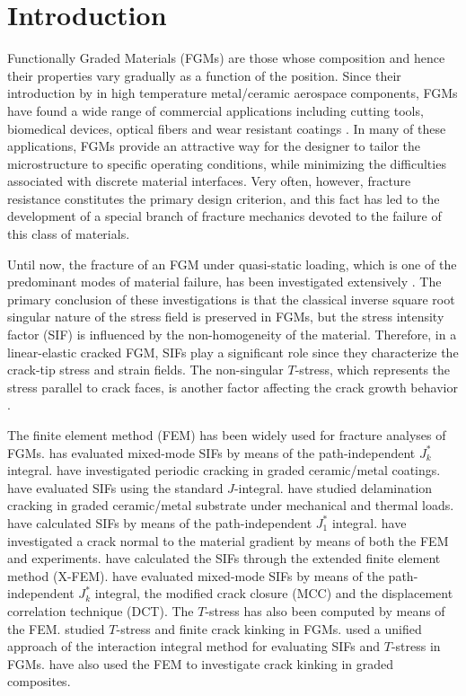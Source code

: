 \section{Introduction}
\label{intro}
Functionally Graded Materials (FGMs) are those whose composition and hence their properties vary gradually as a function of the position. Since their introduction by \cite{Kawasaki1987} in high temperature metal/ceramic aerospace components, FGMs have found a wide range of commercial applications including cutting tools, biomedical devices, optical fibers and wear resistant coatings \citep{Uemura2003}. In many of these applications, FGMs provide an attractive way for the designer to tailor the microstructure to specific operating conditions, while minimizing the difficulties associated with discrete material interfaces. Very often, however, fracture resistance constitutes the primary design criterion, and this fact has led to the development of a special branch of fracture mechanics devoted to the failure of this class of materials.

Until now, the fracture of an FGM under quasi-static loading, which is one of the predominant modes of material failure, has been investigated extensively \citep{Eischen1987,Jin1994,Erdogan1995}. The primary conclusion of these investigations is that the classical inverse square root singular nature of the stress field is preserved in FGMs, but the stress intensity factor (SIF) is influenced by the non-homogeneity of the material. Therefore, in a linear-elastic cracked FGM, SIFs play a significant role since they characterize the crack-tip stress and strain fields. The non-singular $T$-stress, which represents the stress parallel to crack faces, is another factor affecting the crack growth behavior \citep{Becker2001}.

The finite element method (FEM) has been widely used for fracture analyses of FGMs. \cite{Eischen1987} has evaluated mixed-mode SIFs by means of the path-independent $J_{k}^{*}$ integral. \cite{Bao1995} have investigated periodic cracking in graded ceramic/metal coatings. \cite{Gu1997} have evaluated SIFs using the standard $J$-integral. \cite{Bao1997} have studied delamination cracking in graded ceramic/metal substrate under mechanical and thermal loads. \cite{Anlas2000} have calculated SIFs by means of the path-independent $J_{1}^{*}$ integral. \cite{Marur2000} have investigated a crack normal to the material gradient by means of both the FEM and experiments. \cite{Dolbow2002} have calculated the SIFs through the extended finite element method (X-FEM). \cite{Kim2002} have evaluated mixed-mode SIFs by means of the path-independent $J_{k}^{*}$ integral, the modified crack closure (MCC) and the displacement correlation technique (DCT). The $T$-stress has also been computed by means of the FEM. \cite{Becker2001} studied $T$-stress and finite crack kinking in FGMs. \cite{Kim2003} used a unified approach of the interaction integral method for evaluating SIFs and $T$-stress in FGMs. \cite{Chapa2002,Chapa2002b} have also used the FEM to investigate crack kinking in graded composites. 

